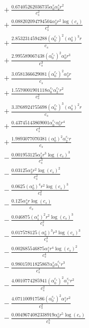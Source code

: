 \documentclass[10pt]{article}
\begin{document}
\begin{align*}
&{}  + \frac{0.67405262036735 \alpha_{0}^s \alpha_{2}^s r^{2}}{c_{s}^{2}} \\
&{}  + \frac{0.088202094794504 \alpha_{3}^s r^{2} \log{\left(c_{s} \right)}}{c_{s}^{2}} \\
&{}  + \frac{2.8532314594288 \left(\alpha_{0}^{c_s}\right)^{2} \left(\alpha_{0}^s\right)^{3} r}{c_{s}} \\
&{}  + \frac{2.995589067438 \left(\alpha_{0}^{c_s}\right)^{2} \alpha_{0}^s r^{3}}{c_{s}^{3}} \\
&{}  + \frac{3.0581366629081 \left(\alpha_{0}^{c_s}\right)^{2} \alpha_{2}^s r}{c_{s}} \\
&{}  + \frac{1.5570001901118 \alpha_{0}^{c_s} \alpha_{2}^{c_s} r^{2}}{c_{s}^{2}} \\
&{}  + \frac{3.3768924755698 \left(\alpha_{0}^{c_s}\right)^{3} \left(\alpha_{0}^s\right)^{2} r}{c_{s}} \\
&{}  + \frac{0.43745143869001 \alpha_{0}^{c_s} \alpha_{0}^s r^{4}}{c_{s}^{4}} \\
&{}  + \frac{1.9893077070381 \left(\alpha_{0}^s\right)^{2} \alpha_{2}^{c_s} r}{c_{s}} \\
&{}  - \frac{0.001953125 \alpha_{2}^s r^{3} \log{\left(c_{s} \right)}^{3}}{c_{s}^{3}} \\
&{}  - \frac{0.03125 \alpha_{3}^s r^{2} \log{\left(c_{s} \right)}^{2}}{c_{s}^{2}} \\
&{}  - \frac{0.0625 \left(\alpha_{0}^s\right)^{4} r^{2} \log{\left(c_{s} \right)}^{3}}{c_{s}^{2}} \\
&{}  - \frac{0.125 \alpha_{4}^s r \log{\left(c_{s} \right)}}{c_{s}} \\
&{}  - \frac{0.046875 \left(\alpha_{1}^s\right)^{2} r^{2} \log{\left(c_{s} \right)}^{3}}{c_{s}^{2}} \\
&{}  - \frac{0.017578125 \left(\alpha_{0}^s\right)^{3} r^{3} \log{\left(c_{s} \right)}^{3}}{c_{s}^{3}} \\
&{}  - \frac{0.002685546875 \alpha_{1}^s r^{4} \log{\left(c_{s} \right)}^{2}}{c_{s}^{4}} \\
&{}  - \frac{0.98015911825867 \alpha_{0}^s \alpha_{1}^{c_s} r^{3}}{c_{s}^{3}} \\
&{}  - \frac{4.0010774285941 \left(\alpha_{0}^{c_s}\right)^{2} \alpha_{1}^{c_s} r^{2}}{c_{s}^{2}} \\
&{}  - \frac{4.071100917586 \left(\alpha_{0}^{c_s}\right)^{2} \alpha_{1}^s r^{2}}{c_{s}^{2}} \\
&{}  - \frac{0.0049674082338919 \alpha_{0}^s r^{5} \log{\left(c_{s} \right)}}{c_{s}^{5}} \\

\end{align*}
\end{document}
